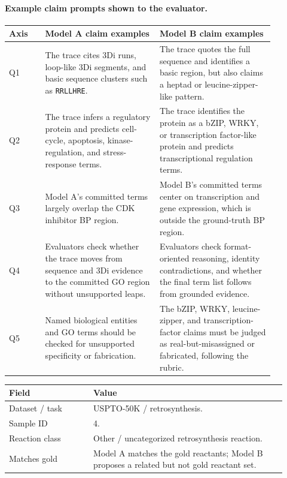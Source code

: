 \begin{appendices}
\paragraph{Example claim prompts shown to the evaluator.}
\begin{longtable}{P{0.12\linewidth}P{0.38\linewidth}P{0.38\linewidth}}
\toprule
\textbf{Axis} & \textbf{Model A claim examples} & \textbf{Model B claim examples} \\
\midrule
Q1 & The trace cites 3Di runs, loop-like 3Di segments, and basic sequence clusters such as \texttt{RRLLHRE}. &
The trace quotes the full sequence and identifies a basic region, but also claims a heptad or leucine-zipper-like pattern. \\
Q2 & The trace infers a regulatory protein and predicts cell-cycle, apoptosis, kinase-regulation, and stress-response terms. &
The trace identifies the protein as a bZIP, WRKY, or transcription factor-like protein and predicts transcriptional regulation terms. \\
Q3 & Model A's committed terms largely overlap the CDK inhibitor BP region. &
Model B's committed terms center on transcription and gene expression, which is outside the ground-truth BP region. \\
Q4 & Evaluators check whether the trace moves from sequence and 3Di evidence to the committed GO region without unsupported leaps. &
Evaluators check format-oriented reasoning, identity contradictions, and whether the final term list follows from grounded evidence. \\
Q5 & Named biological entities and GO terms should be checked for unsupported specificity or fabrication. &
The bZIP, WRKY, leucine-zipper, and transcription-factor claims must be judged as real-but-misassigned or fabricated, following the rubric. \\
\bottomrule
\end{longtable}


\begin{longtable}{P{0.28\linewidth}P{0.64\linewidth}}
\toprule
\textbf{Field} & \textbf{Value} \\
\midrule
Dataset / task & USPTO-50K / retrosynthesis. \\
Sample ID & 4. \\
Reaction class & Other / uncategorized retrosynthesis reaction. \\
Matches gold & Model A matches the gold reactants; Model B proposes a related but not gold reactant set. \\
\bottomrule
\end{longtable}


\end{appendices}
